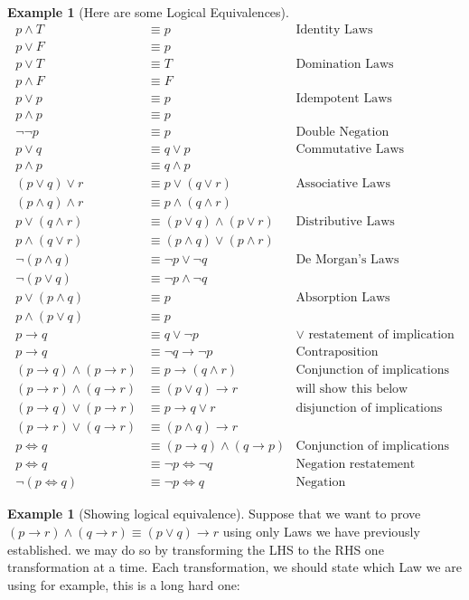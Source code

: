 \documentclass[letterpaper,10pt]{article}
\theoremstyle{plain}
\theoremstyle{definition}
\newtheorem{exmp}[thm]{Example}
\theoremstyle{remark}
\providecommand{\land}{\ensuremath{\wedge}}
\providecommand{\lor}{\ensuremath{\vee}}
\begin{document}
\begin{exmp}[Here are some Logical Equivalences]
\begin{align}
p \land T &\equiv p  & \text{Identity Laws}\\
p \lor F &\equiv p  & \\
p \lor T & \equiv T & \text{Domination Laws}\\
p \land F & \equiv F & \\
p \lor p & \equiv p & \text{Idempotent Laws}\\
p \land p & \equiv p & \\
\lnot \lnot p & \equiv p & \text{Double Negation}\\
p \lor q & \equiv q \lor p & \text{Commutative Laws}\\
p \land p & \equiv q \land p & \\
(p \lor q) \lor r & \equiv p \lor (q \lor r) & \text{Associative Laws}\\
(p \land q) \land r & \equiv p \land (q \land r) \\
p \lor (q\land r) & \equiv (p \lor q ) \land 
 (p \lor r)  & \text{Distributive Laws}\\
p \land (q\lor r) & \equiv (p \land q) \lor (p \land r) & \\
\lnot (p\land q) & \equiv \lnot p \lor \lnot q & \text{De Morgan's Laws}\\
\lnot (p\lor q) & \equiv \lnot p \land \lnot q & \\
p \lor (p \land q) & \equiv p & \text{Absorption Laws}\\
p \land (p \lor q)& \equiv p &\\
p \to q & \equiv q \lor \lnot p   & \text{$\lor$ restatement of implication}\\
p \to q & \equiv \lnot q \to \lnot p & \text{Contraposition}\\
(p \to q) \land (p \to r) &\equiv p\to (q \land r)& \text{Conjunction of implications}\\
(p \to r) \land (q \to r) &\equiv (p \lor q) \to r & \text{will show this below}  \\ 
(p \to q) \lor (p \to r) &\equiv p\to q \lor r& \text{disjunction of implications}\\
(p \to r) \lor (q \to r) &\equiv (p\land q)\to r\\
p \iff q & \equiv (p\to q)\land(q\to p)  & \text{Conjunction of implications}\\
p \iff q & \equiv \lnot p \iff \lnot q  & \text{Negation restatement}\\
\lnot(p \iff q) & \equiv \lnot p \iff q  & \text{Negation}
\end{align}
\newpage
\begin{exmp}[Showing logical equivalence]
Suppose that we want to prove $(p \to r) \land (q \to r) \equiv (p \lor q) \to r$ using only Laws we have previously established.
we may do so by transforming the LHS to the RHS one transformation at a time. Each transformation, we should state which Law we are using for example, this is a long hard one:


\end{exmp}
\end{exmp}
\end{document}
